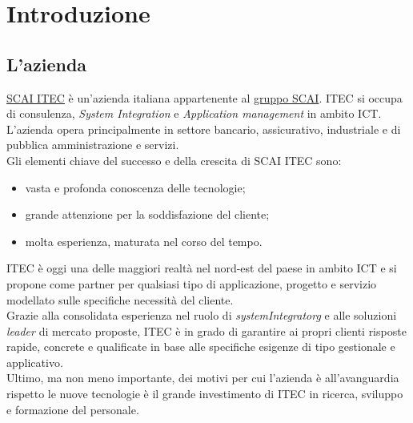 
\chapter{Introduzione}
\label{cap:introduzione}





\section{L'azienda}

\href{https://scaiitec.it/}{SCAI ITEC} è un'azienda italiana appartenente al \href{https://www.grupposcai.it/}{gruppo SCAI}. ITEC si occupa di consulenza, \textit{System Integration} e \textit{Application management} in ambito ICT. L'azienda opera principalmente in settore bancario, assicurativo, industriale e di pubblica amministrazione e servizi. \\Gli elementi chiave del successo e della crescita di SCAI ITEC sono:
\begin{itemize}
    \item vasta e profonda conoscenza delle tecnologie;
    \item grande attenzione per la soddisfazione del cliente;
    \item molta esperienza, maturata nel corso del tempo.
\end{itemize} 
ITEC è oggi una delle maggiori realtà nel nord-est del paese in ambito ICT e si propone come partner per qualsiasi tipo di applicazione, progetto e servizio modellato sulle specifiche necessità del cliente. 
\\Grazie alla consolidata esperienza nel ruolo di \textit{\gls{systemIntegratorg}\glsfirstoccur{}} e alle soluzioni \textit{leader} di mercato proposte, ITEC è in grado di garantire ai propri clienti risposte rapide, concrete e qualificate in base alle specifiche esigenze di tipo gestionale e applicativo.
\\Ultimo, ma non meno importante, dei motivi per cui l'azienda è all'avanguardia rispetto le nuove tecnologie è il grande investimento di ITEC in ricerca, sviluppo e formazione del personale.

